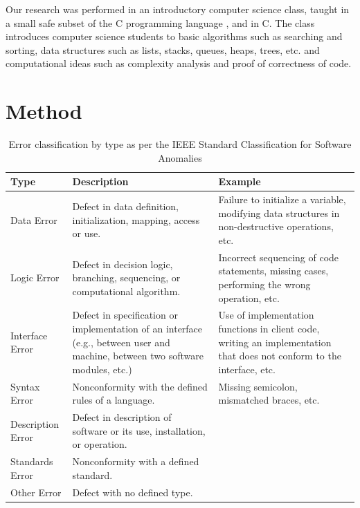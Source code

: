 \documentclass{sig-alternate}
\begin{document}
Our research was performed in an introductory computer science class,
taught in a small safe subset of the C programming language
\cite{Arnold10}, and in C. The class introduces computer science
students to basic algorithms such as searching and sorting, data
structures such as lists, stacks, queues, heaps, trees, etc. and
computational ideas such as complexity analysis and proof of
correctness of code.

\section{Method}
\label{sec:method}

\begin{table}
\def\arraystretch{1.6}
\centering
\caption{Error classification by type as per the IEEE Standard Classification for Software Anomalies \cite{IEEE10}}
\label{table:IEEE}
\begin{tabular}{|p{1in}|p{2.9in}|p{2.6in}|} \hline
\textbf{Type} & \textbf{Description} & \textbf{Example}\\ \hline
Data Error&
Defect in data definition, initialization, mapping, access or use.&
Failure to initialize a variable, modifying data structures in non-destructive operations, etc.\\ \hline

Logic Error&
Defect in decision logic, branching, sequencing, or computational algorithm.&
Incorrect sequencing of code statements, missing cases, performing the wrong operation, etc.\\ \hline

Interface Error&
Defect in specification or implementation of an interface (e.g., between user and machine, between two software modules, etc.)&
Use of implementation functions in client code, writing an implementation that does not conform to the interface, etc.\\ \hline

Syntax Error&
Nonconformity with the defined rules of a language.&
Missing semicolon, mismatched braces, etc.\\ \hline

Description Error&
Defect in description of software or its use, installation, or operation.&
\\ \hline

Standards Error&
Nonconformity with a defined standard.&
\\ \hline

Other Error&
Defect with no defined type.
&
\\ \hline
\end{tabular}
\end{table}
\end{document}
